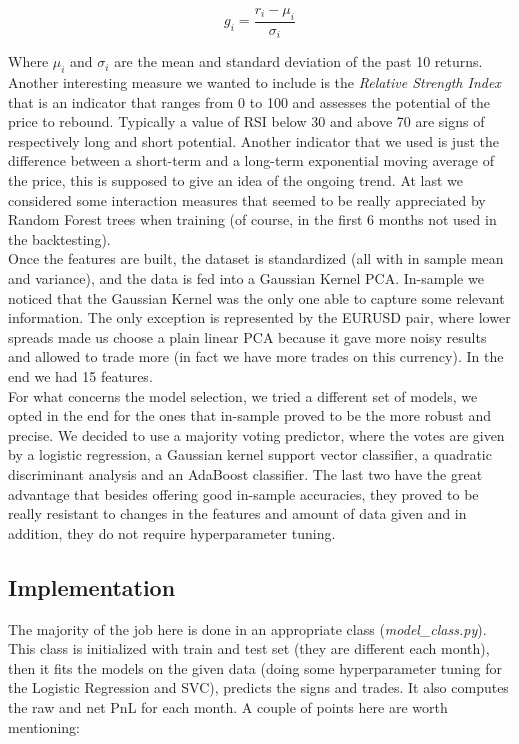 \documentclass[a4paper]{article}
\begin{document}
$$
g_i = \frac{r_i - \mu_i}{\sigma_i}
$$

Where $\mu_i$ and $\sigma_i$ are the mean and standard deviation of the past 10 returns. Another interesting measure we wanted to include is the \textit{Relative Strength Index} that is an indicator that ranges from 0 to 100 and assesses the potential of the price to rebound. Typically a value of RSI below 30 and above 70 are signs of respectively long and short potential. Another indicator that we used is just the difference between a short-term and a long-term exponential moving average of the price, this is supposed to give an idea of the ongoing trend. At last we considered some interaction measures that seemed to be really appreciated by Random Forest trees when training (of course, in the first 6 months not used in the backtesting).\\
Once the features are built, the dataset is standardized (all with in sample mean and variance), and the data is fed into a Gaussian Kernel PCA. In-sample we noticed that the Gaussian Kernel was the only one able to capture some relevant information. The only exception is represented by the EURUSD pair, where lower spreads made us choose a plain linear PCA because it gave more noisy results and allowed to trade more (in fact we have more trades on this currency). In the end we had 15 features.\\
For what concerns the model selection, we tried a different set of models, we opted in the end for the ones that in-sample proved to be the more robust and precise. We decided to use a majority voting predictor, where the votes are given by a logistic regression, a Gaussian kernel support vector classifier, a quadratic discriminant analysis and an AdaBoost classifier. The last two have the great advantage that besides offering good in-sample accuracies, they proved to be really resistant to changes in the features and amount of data given and in addition, they do not require hyperparameter tuning.\\ 

\subsection{Implementation}

The majority of the job here is done in an appropriate class (\textit{model\_class.py}).
This class is initialized with train and test set (they are different each month), then it fits the models on the given data (doing some hyperparameter tuning for the Logistic Regression and SVC), predicts the signs and trades. It also computes the raw and net PnL for each month. A couple of points here are worth mentioning:
\end{document}
